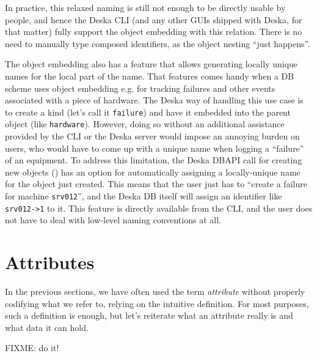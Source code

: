\documentclass{article}
\begin{document}
In practice, this relaxed naming is still not enough to be directly usable by people, and hence the Deska CLI (and any
other GUIs shipped with Deska, for that matter) fully support the object embedding with this relation.  There is no need
to manually type composed identifiers, as the object nesting ``just happens''.

The object embedding also has a feature that allows generating locally unique names for the local part of the name.
That features comes handy when a DB scheme uses object embedding e.g. for tracking failures and other events associated
with a piece of hardware.  The Deska way of handling this use case is to create a kind (let's call it {\tt failure}) and
have it embedded into the parent object (like {\tt hardware}).  However, doing so without an additional assistance
provided by the CLI or the Deska server would impose an annoying burden on users, who would have to come up with a
unique name when logging a ``failure'' of an equipment.  To address this limitation, the Deska DBAPI call for creating
new objects () has an option for automatically assigning a locally-unique name for the object
just created.  This means that the user just has to ``create a failure for machine {\tt srv012}'', and the Deska DB
itself will assign an identifier like {\tt srv012->1} to it.  This feature is directly available from the CLI, and the
user does not have to deal with low-level naming conventions at all.

\section{Attributes}

In the previous sections, we have often used the term {\em attribute} without properly codifying what we refer to,
relying on the intuitive definition.  For most purposes, such a definition is enough, but let's reiterate what an
attribute really is and what data it can hold.

FIXME: do it!
\end{document}
